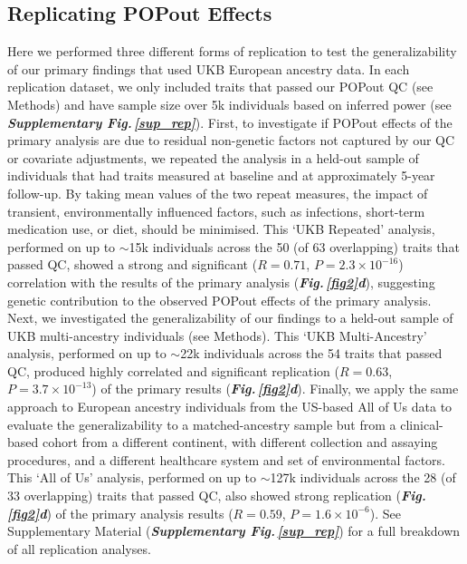 \documentclass[12pt]{zHenriquesLab-StyleBioRxiv}
\newcommand\dref[2]{\normalsize{\textbf{\textit{Fig.\,\ref{#1}#2}}}\normalsize{}}
\newcommand\sref[1]{\normalsize{\textbf{\textit{Supplementary Fig.\,\ref{#1}}}}\normalsize{}}
\begin{document}
{{\subsection*{Replicating POPout Effects} \label{sec:res1}
Here we performed three different forms of replication to test the generalizability of our primary 
findings that used UKB European ancestry data. In each replication dataset, 
we only included traits that passed our POPout QC (see Methods) and have sample size 
over 5k individuals based on inferred power (see \sref{sup_rep}). First, 
to investigate if POPout effects of the primary analysis are due to residual 
non-genetic factors not captured by our QC or covariate adjustments, we repeated 
the analysis in a held-out sample of individuals that had traits measured at 
baseline and at approximately 5-year follow-up. By taking mean values of the 
two repeat measures, the impact of transient, environmentally influenced factors, 
such as infections, short-term medication use, or diet, should be minimised. 
This ‘UKB Repeated’ analysis, performed on up to $\sim$15k individuals across the 
50 (of 63 overlapping) traits that passed QC, showed a strong and 
significant ($R=0.71$, $P=2.3 \times 10^{-16}$) correlation with the results 
of the primary analysis (\dref{fig2}{d}), suggesting genetic contribution to the 
observed POPout effects of the primary analysis. Next, we investigated the generalizability 
of our findings to a held-out sample of UKB multi-ancestry individuals (see Methods). 
This ‘UKB Multi-Ancestry’ analysis, performed on up to $\sim$22k individuals across the 
54 traits that passed QC, produced highly correlated and significant 
replication ($R=0.63$, $P=3.7 \times 10^{-13}$) of the primary results (\dref{fig2}{d}). 
Finally, we apply the same approach to European ancestry individuals from the 
US-based All of Us data \cite{Bick2024} to evaluate the generalizability to a matched-ancestry 
sample but from a clinical-based cohort from a different continent, with different 
collection and assaying procedures, and a different healthcare system and set of 
environmental factors. This ‘All of Us’ analysis, performed on up to $\sim$127k individuals 
across the 28 (of 33 overlapping) traits that passed QC, also showed strong replication (\dref{fig2}{d}) of the primary 
analysis results ($R=0.59$, $P=1.6 \times 10^{-6}$). 
See Supplementary Material (\sref{sup_rep}) for a full breakdown of all replication analyses. 
%
%
}}
\end{document}
